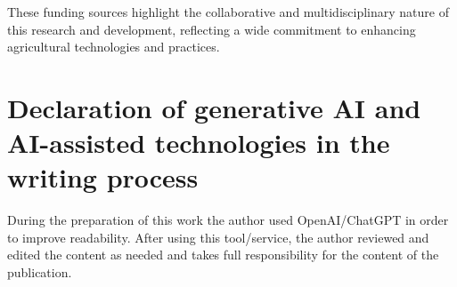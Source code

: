 \documentclass[authoryear,preprint,review,12pt]{elsarticle}
\begin{document}
These funding sources highlight the collaborative and multidisciplinary nature of this research and development, reflecting a wide commitment to enhancing agricultural technologies and practices.%


\section{Declaration of generative AI and AI-assisted technologies in the writing process}
During the preparation of this work the author used OpenAI/ChatGPT in order to improve readability. 
After using this tool/service, the author reviewed and edited the content as needed and takes full responsibility for the content of the publication.





% 





\end{document}
